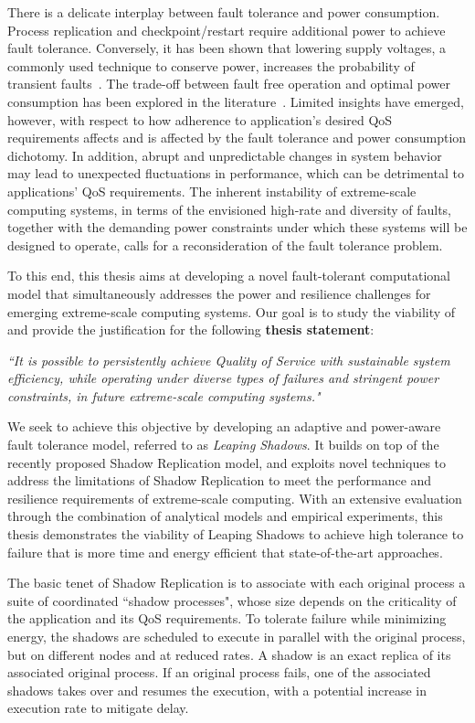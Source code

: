There is a delicate interplay between fault tolerance and power consumption. Process replication and checkpoint/restart require 
additional power to achieve fault tolerance. Conversely, it has been shown that lowering supply voltages, a commonly used 
technique to conserve power, increases the probability of transient faults~\cite{chandra2008defect,zhao2008reliability}. The trade-off between fault free operation and 
optimal power consumption has been explored in the literature~\cite{meneses2014energy,mills2014energy}. Limited insights have emerged, however, with respect to how 
adherence to application's desired QoS requirements affects and is affected by the fault tolerance and power consumption 
dichotomy. In addition, abrupt and unpredictable changes in system behavior may lead to unexpected fluctuations in performance, 
which can be detrimental to applications’ QoS requirements. The inherent instability of extreme-scale computing systems, 
in terms of the envisioned high-rate and diversity of faults, together with the demanding power constraints under which 
these systems will be designed to operate, calls for a 
reconsideration of the fault tolerance problem.

To this end, this thesis aims at developing a novel fault-tolerant computational model that simultaneously addresses the power and resilience challenges for emerging extreme-scale computing systems. Our goal is to study the viability of and provide the justification for the following \textbf{thesis statement}: 

\vskip 10pt
\textit{``It is possible to persistently achieve Quality of Service  with sustainable system efficiency, while operating under diverse types of failures and stringent power constraints, in future extreme-scale computing systems."}
\vskip 10pt

We seek to achieve this objective by developing an adaptive and power-aware fault tolerance model, referred to as \textit{Leaping Shadows}. It builds on top of the recently proposed Shadow Replication model, and exploits novel techniques to address the limitations of Shadow Replication to meet the performance and resilience requirements of extreme-scale computing. With an extensive evaluation through the combination of analytical models and empirical experiments, this thesis demonstrates the viability of Leaping Shadows to achieve high tolerance to failure that is more time and energy efficient that state-of-the-art approaches.

The basic tenet of Shadow Replication is to associate with each original process a suite of coordinated ``shadow processes", whose size depends on the criticality of the application and its QoS requirements. To tolerate failure while minimizing energy, the shadows are scheduled to execute in parallel with the original process, but on different nodes and at reduced rates. A shadow is an exact replica of its associated original process. If an original process fails, one of the associated shadows takes over and resumes the execution, with a potential increase in execution rate to mitigate delay. 


